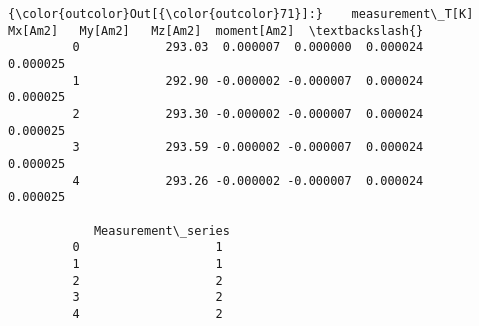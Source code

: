 \documentclass{article}
\begin{document}
            \begin{Verbatim}[commandchars=\\\{\}]
{\color{outcolor}Out[{\color{outcolor}71}]:}    measurement\_T[K]   Mx[Am2]   My[Am2]   Mz[Am2]  moment[Am2]  \textbackslash{}
         0            293.03  0.000007  0.000000  0.000024     0.000025   
         1            292.90 -0.000002 -0.000007  0.000024     0.000025   
         2            293.30 -0.000002 -0.000007  0.000024     0.000025   
         3            293.59 -0.000002 -0.000007  0.000024     0.000025   
         4            293.26 -0.000002 -0.000007  0.000024     0.000025   
         
            Measurement\_series  
         0                   1  
         1                   1  
         2                   2  
         3                   2  
         4                   2  
\end{Verbatim}
        
\end{document}
